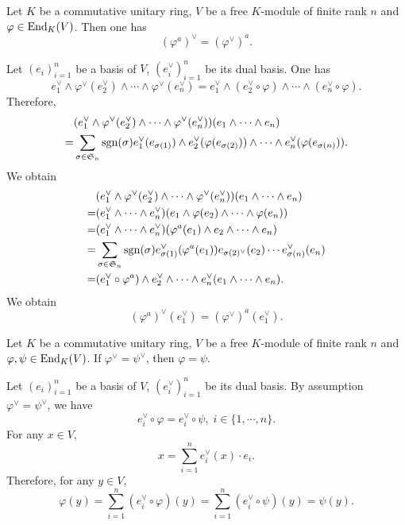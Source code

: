 \begin{lemmaenv}\label{lem:6.2.4}
    Let $K$ be a commutative unitary ring,
    $V$ be a free $K$-module of finite rank $n$ and $\varphi \in \operatorname{\mathrm{End}}_{K}(V)$.
    Then one has
    $$(\varphi^a)^\vee = (\varphi^\vee)^a.$$
\end{lemmaenv}
\begin{proofenv}
    Let $(e_i)_{i=1}^{n}$ be a basis of $V$,
    $(e_i^\vee)_{i=1}^{n}$ be its dual basis.
    One has 
    $$e_1^\vee \wedge \varphi^\vee (e_2^\vee) \wedge \cdots \wedge \varphi^\vee (e_n^\vee) = e_1^\vee \wedge (e_2^\vee \circ \varphi) \wedge \cdots \wedge (e_n^\vee \circ \varphi).$$
    Therefore,
    $$\begin{aligned}
        &(e_1^\vee \wedge \varphi^\vee (e_2^\vee) \wedge \cdots \wedge \varphi^\vee (e_n^\vee)) (e_1\wedge \cdots \wedge e_n)\\
        = & \sum_{\sigma \in \mathfrak{S}_n} \operatorname{\mathrm{sgn}}(\sigma) e_1^\vee(e_{\sigma(1)})\wedge e_2^\vee(\varphi(e_{\sigma(2)})) \wedge \cdots \wedge e_n^\vee(\varphi(e_{\sigma(n)})).
    \end{aligned}$$
    We obtain
    $$\begin{aligned}
        & (e_1^\vee \wedge \varphi^\vee(e_2^\vee) \wedge \cdots \wedge \varphi^\vee(e_n^\vee))(e_1 \wedge \cdots \wedge e_n)\\
        = & (e_1^\vee \wedge \cdots \wedge e_n^\vee) (e_1 \wedge \varphi(e_2) \wedge \cdots \wedge \varphi(e_n))\\
        = & (e_1^\vee \wedge \cdots \wedge e_n^\vee)(\varphi^a(e_1) \wedge e_2 \wedge \cdots \wedge e_n)\\
        = & \sum_{\sigma \in \mathfrak{S}_n} \operatorname{\mathrm{sgn}}(\sigma) e^\vee_{\sigma(1)} (\varphi^a(e_1))e_{\sigma(2)^\vee}(e_2) \cdots e_{\sigma(n)}^\vee(e_n)\\
        = & (e_1^\vee \circ \varphi^a) \wedge e_2^\vee \wedge \cdots \wedge e_n^\vee (e_1 \wedge \cdots \wedge e_n).
    \end{aligned}$$
    We obtain
    $$(\varphi^a)^\vee (e_1^\vee) = (\varphi^\vee)^a (e_1^\vee).$$
\end{proofenv}

\begin{lemmaenv}\label{lem:6.2.5}
    Let $K$ be a commutative unitary ring,
    $V$ be a free $K$-module of finite rank $n$ and $\varphi, \psi \in \operatorname{\mathrm{End}}_{K}(V)$.
    If $\varphi^\vee = \psi^\vee$, then $\varphi = \psi$.
\end{lemmaenv}
\begin{proofenv}
    Let $(e_i)_{i=1}^{n}$ be a basis of $V$,
    $(e_i^\vee)_{i=1}^{n}$ be its dual basis.
    By assumption $\varphi^\vee = \psi^\vee$, we have
    $$ e_i^\vee \circ \varphi = e_i^\vee \circ \psi,\; i \in \{1,\cdots,n\}.$$
    For any $x \in V$,
    $$x = \sum_{i=1}^{n} e_i^\vee(x) \cdot e_i.$$
    Therefore, for any $y \in V$,
    $$\varphi(y) = \sum_{i=1}^{n} (e_i^\vee \circ \varphi) (y) = \sum_{i = 1}^{n} (e_i^\vee \circ \psi) (y) = \psi(y).$$
\end{proofenv}

